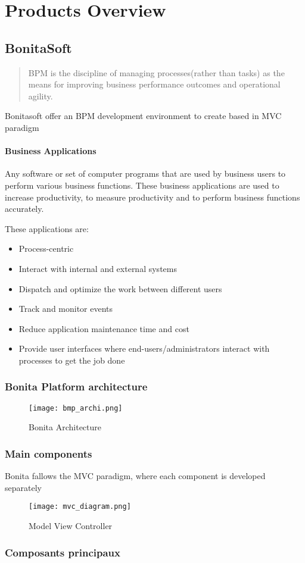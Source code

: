 \section{Products Overview}
\subsection{BonitaSoft}
\begin{quotation}
BPM is the discipline of managing processes(rather than tasks) as the means for improving business performance outcomes and operational agility. \cite{gartnerdic}
\end{quotation}

Bonitasoft offer an BPM development environment to create  based in MVC paradigm

\paragraph{Business Applications} \label{businessApp}
Any software or set of computer programs that are used by business users to perform various business functions. These business applications are used to increase productivity, to measure productivity and to perform business functions accurately.\cite{BusinessSoftware}

These applications are:
\begin{itemize}
\item Process-centric
\item Interact with internal and external systems
\item Dispatch and optimize the work between different users
\item Track and monitor events
\item Reduce application maintenance time and cost
\item Provide user interfaces where end-users/administrators interact with processes to get the job done
\end{itemize}

\subsubsection{Bonita Platform architecture}
\begin{figure}[!ht]
\texttt{[image: bmp\_archi.png]}
\caption{Bonita Architecture}
\end{figure}

\subsubsection{Main components}
Bonita fallows the MVC paradigm, where each component is developed separately

\begin{figure}[!ht]
\texttt{[image: mvc\_diagram.png]}
\caption{Model View Controller}
\end{figure}


\subsubsection{Composants principaux}






